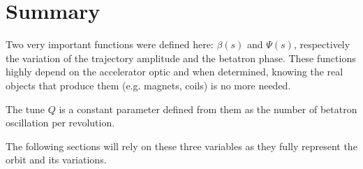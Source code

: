 \section{Summary}
Two very important functions were defined here: $\beta (s)$ and $\Psi (s)$, respectively the variation of the trajectory amplitude and the betatron phase. These functions highly depend on the accelerator optic and when determined, knowing the real objects that produce them (e.g. magnets, coils) is no more needed.

The tune $Q$ is a constant parameter defined from them as the number of betatron oscillation per revolution.

The following sections will rely on these three variables as they fully represent the orbit and its variations.
